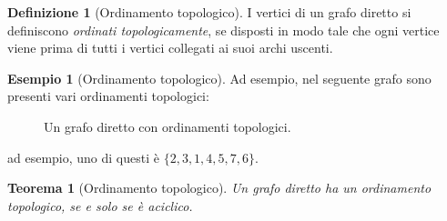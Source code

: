 \documentclass[14pt]{extreport}
\newtheorem{theorem}{Teorema}[subsection]
\theoremstyle{definition}
\newtheorem{definition}{Definizione}[subsection]
\theoremstyle{definition}
\newtheorem{example}{Esempio}[subsection]
\begin{document}
\begin{definition}[Ordinamento topologico]
    I vertici di un grafo diretto si definiscono \textit{ordinati topologicamente}, se disposti in modo tale che ogni vertice viene prima di tutti i vertici collegati ai suoi archi uscenti.
\end{definition}

\begin{example}[Ordinamento topologico]
    Ad esempio, nel seguente grafo sono presenti vari ordinamenti topologici:

    \begin{figure}[H]
        \centering
        \caption{Un grafo diretto con ordinamenti topologici.}
    \end{figure}

    ad esempio, uno di questi è $\{2, 3, 1, 4, 5, 7, 6\}$.
\end{example}

\begin{theorem}[Ordinamento topologico]
    \label{Ordinamento topologico}
    Un grafo diretto ha un ordinamento topologico, se e solo se è aciclico.
\end{theorem}
\end{document}
